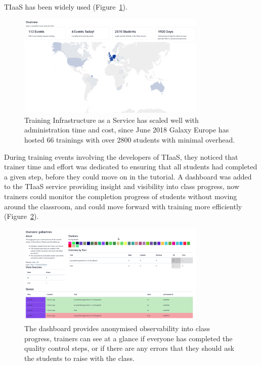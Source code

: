\documentclass[10pt,letterpaper]{article}
\begin{document}
TIaaS has been widely used (Figure~\ref{fig:tiaas-map}).

\begin{figure}[!ht]
	\centering
	\includegraphics[width=0.8\textwidth]{images/tiaas-map.png}
	\caption{Training Infrastructure as a Service has scaled well with administration time and cost, since June 2018 Galaxy Europe has hosted 66 trainings with over 2800 students with minimal overhead.\label{fig:tiaas-map}}
\end{figure}


During training events involving the developers of TIaaS, they noticed that trainer time and effort was dedicated to ensuring that all students had completed a given step, before they could move on in the tutorial.
A dashboard was added to the TIaaS service providing insight and visibility into class progress, now trainers could monitor the completion progress of students without moving around the classroom, and could move forward with training more efficiently (Figure~\ref{fig:tiaas}).


\begin{figure}[!ht]
	\centering
	\includegraphics[width=0.8\textwidth]{images/tiaas.png}
	\caption{The dashboard provides anonymised observability into class progress, trainers can see at a glance if everyone has completed the quality control steps, or if there are any errors that they should ask the students to raise with the class.\label{fig:tiaas}}
\end{figure}
\end{document}

